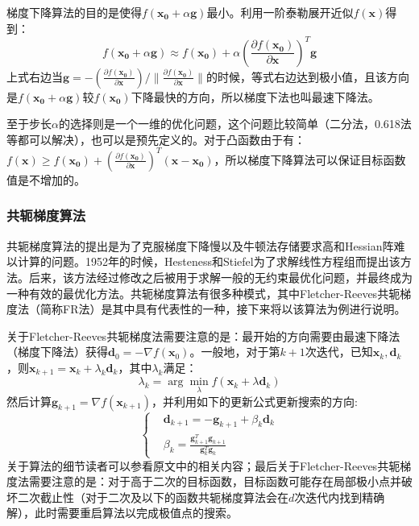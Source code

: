 梯度下降算法的目的是使得$f(\bm{x_0}+\alpha \bm{g})$最小。利用一阶泰勒展开近似$f(\bm{x})$得到：
\begin{equation}
\label{Gradient_Descend}
f(\bm{x_0}+\alpha \bm{g}) \approx f(\bm{x_0})+\alpha\left(\frac{\partial f(\bm{x_0})}{\partial \bm{x}}\right)^{T}\bm{g}
\end{equation}
上式右边当$\bm{g}=-\left(\frac{\partial f(\bm{x_0})}{\partial \bm{x}}\right)/\|\frac{\partial f(\bm{x_0})}{\partial \bm{x}}\|$的时候，等式右边达到极小值，且该方向是$f(\bm{x_0}+\alpha \bm{g})$较$f(\bm{x_0})$下降最快的方向，所以梯度下法也叫最速下降法。

至于步长$\alpha$的选择则是一个一维的优化问题，这个问题比较简单（二分法，0.618法等都可以解决），也可以是预先定义的。对于凸函数由于有：$f(\bm{x})\geq f(\bm{x_0})+\left(\frac{\partial f(\bm{x_0})}{\partial \bm{x}}\right)^{T}(\bm{x-x_0})$，所以梯度下降算法可以保证目标函数值是不增加的。
\subsubsection{共轭梯度算法}
共轭梯度算法的提出是为了克服梯度下降慢以及牛顿法存储要求高和Hessian阵难以计算的问题。1952年的时候，Hesteness和Stiefel为了求解线性方程组而提出该方法。后来，该方法经过修改之后被用于求解一般的无约束最优化问题，并最终成为一种有效的最优化方法。共轭梯度算法有很多种模式，其中Fletcher-Reeves共轭梯度法\cite{Conjugate_Gradient_FR}（简称FR法）是其中具有代表性的一种，接下来将以该算法为例进行说明。

关于Fletcher-Reeves共轭梯度法需要注意的是：最开始的方向需要由最速下降法（梯度下降法）获得$\bm{d}_0=-\nabla f(\bm{x}_0)$。一般地，对于第$k+1$次迭代，已知$\bm{x}_k,\bm{d}_k$，则$\bm{x}_{k+1}=\bm{x}_{k}+\lambda_{k}\bm{d}_{k}$，其中$\lambda_k$满足：
\begin{equation}
\label{linear_search}
\lambda_{k}=\arg\min_{\lambda} f(\bm{x}_k+\lambda \bm{d}_{k})
\end{equation}
然后计算$\bm{g}_{k+1}=\nabla f(\bm{x}_{k+1})$，并利用如下的更新公式更新搜索的方向\cite{Conjugate_Gradient_FR}:
\begin{equation}
\label{Conjugate_Gradeint_update}
\left\{
\begin{split}
&\bm{d}_{k+1}=-\bm{g}_{k+1}+\beta_{k}\bm{d}_{k}\\
&\beta_{k}=\frac{\bm{g}_{k+1}^{T}\bm{g}_{k+1}}{\bm{g}_{k}^{T}\bm{g}_{k}}
\end{split}
\right.
\end{equation}
关于算法的细节读者可以参看原文\cite{Conjugate_Gradient_FR}中的相关内容；最后关于Fletcher-Reeves共轭梯度法需要注意的是：对于高于二次的目标函数，目标函数可能存在局部极小点并破坏二次截止性（对于二次及以下的函数共轭梯度算法会在$d$次迭代内找到精确解），此时需要重启算法以完成极值点的搜索。
